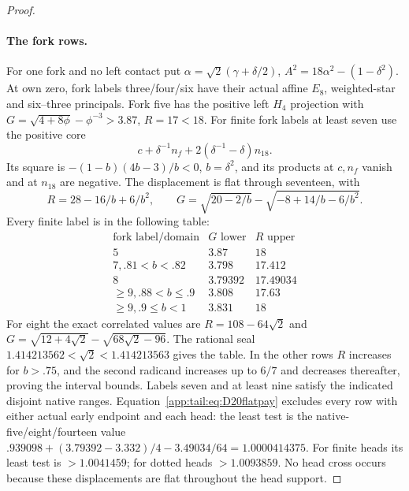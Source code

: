 \begin{proof}
\paragraph{The fork rows.}
For one fork and no left contact put
$\alpha=\sqrt2(\gamma+\delta/2)$,
$A^2=18\alpha^2-(1-\delta^2)$.
At own zero, fork labels three/four/six have their actual affine
$E_8$, weighted-star and six--three principals.
Fork five has the positive left $H_4$ projection with
$G=\sqrt{4+8\phi}-\phi^{-3}>3.87$, $R=17<18$.
For finite fork labels at least seven use the positive core
\[
 c+\delta^{-1}n_f+2(\delta^{-1}-\delta)n_{18}.
\]
Its square is $-(1-b)(4b-3)/b<0$, $b=\delta^2$,
and its products at $c,n_f$ vanish and at $n_{18}$ are
negative. The displacement is flat through seventeen, with
\[
 R=28-16/b+6/b^2,\qquad
 G=\sqrt{20-2/b}-\sqrt{-8+14/b-6/b^2}.
\]
Every finite label is in the following table:
\[
\begin{array}{c|cc}
\text{fork label/domain}&G\text{ lower}&R\text{ upper}\\\hline
5&3.87&18\\
7, .81<b<.82&3.798&17.412\\
8&3.79392&17.49034\\
\ge9, .88<b\le.9&3.808&17.63\\
\ge9, .9\le b<1&3.831&18
\end{array}
\]
For eight the exact correlated values are
$R=108-64\sqrt2$ and
$G=\sqrt{12+4\sqrt2}-\sqrt{68\sqrt2-96}$.
The rational seal $1.414213562<\sqrt2<1.414213563$
gives the table. In the other rows $R$ increases for $b>.75$,
and the second radicand increases up to $6/7$ and decreases
thereafter, proving the interval bounds. Labels seven and at
least nine satisfy the indicated disjoint native ranges.
Equation~\eqref{app:tail:eq:D20flatpay} excludes every row
with either actual early endpoint and each head: the least
test is the native-five/eight/fourteen value
$.939098+(3.79392-3.332)/4-3.49034/64=1.0000414375$.
For finite heads its least test is $>1.0041459$; for dotted
heads $>1.0093859$. No head cross occurs because these
displacements are flat throughout the head support.


\end{proof}
